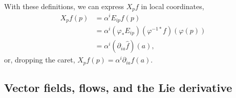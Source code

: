 \documentclass[psamsfonts]{amsart}
\theoremstyle{definition}
\theoremstyle{remark}
\numberwithin{equation}{section}
\begin{document}
With these definitions, we can express $X_pf$ in local coordinates, 
\begin{equation}
\begin{aligned}
X_pf(p) & = {} \alpha^i E_{ip}f(p) \\
& = {} \alpha^i (\varphi_* E_{ip})(\varphi^{-1*}f)(\varphi(p))\\
& = {} \alpha^i \left(\partial_{ia}\hat f\right)(a),%
\end{aligned}
\end{equation}
or, dropping the caret, $X_p f(p) = \alpha^i\partial_{ia} f(a)$. 

\subsection{Vector fields, flows, and the Lie derivative}

\end{document}
